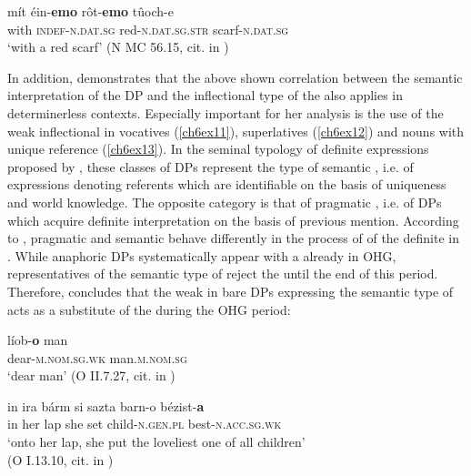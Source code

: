\documentclass[output=paper,colorlinks,citecolor=brown]{langscibook}
\begin{document}
\begin{exe}
\ex\label{ch6ex10}
\gll mít éin-\textbf{emo} rôt-\textbf{emo} tûoch-e\\
with \textsc{indef-n.dat.sg} red-\textsc{n.dat.sg.str} scarf-\textsc{n.dat.sg}\\
\glt `with a red scarf' (N MC 56.15, cit. in \cite[67, ex. (67b)]{Demske01})
\end{exe}

In addition, \citet{Demske01} demonstrates that the above shown correlation
between the semantic interpretation of the DP and the inflectional type
of the  also applies in determinerless contexts. Especially
important for her analysis is the use of the weak inflectional 
in vocatives (\ref{ch6ex11}), superlatives (\ref{ch6ex12}) and nouns with unique reference
(\ref{ch6ex13}). In the seminal typology of definite expressions proposed by \citet{Lobner85}, these classes of DPs represent the type of semantic
, i.e. of expressions denoting referents which are
identifiable on the basis of uniqueness and world knowledge. The
opposite category is that of pragmatic , i.e. of DPs which
acquire definite interpretation on the basis of previous mention.
According to \citet{Demske01}, pragmatic and semantic  behave
differently in the process of  of the definite
 in . While anaphoric DPs systematically appear with a
 already in OHG, representatives of the semantic type of
 reject the  until the end of this period.
Therefore, \citet{Demske01} concludes that the weak 
in bare DPs expressing the semantic type of  acts as a
substitute of the  during the OHG period:

\begin{exe}
\ex\label{ch6ex11}
\gll líob-\textbf{o} man\\
dear-\textsc{m.nom.sg.wk} man.\textsc{m.nom.sg}\\
\glt `dear man' (O II.7.27, cit. in \cite[67, ex. (40a)]{Demske01})
\end{exe}

\begin{exe}
\ex\label{ch6ex12}
\gll in ira bárm si sazta barn-o bézist-\textbf{a}\\
in her lap she set child-\textsc{n.gen.pl} best-\textsc{n.acc.sg.wk}\\
\glt `onto her lap, she put the loveliest one of all children' \\ (O I.13.10, cit. in \cite[67, ex. (44)]{Demske01})
\end{exe}
\end{document}
